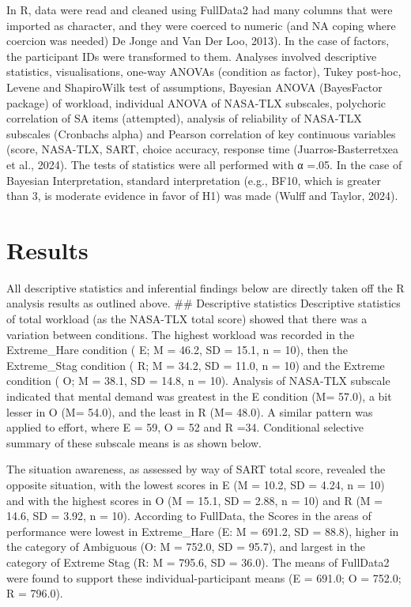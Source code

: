 \documentclass[
]{article}
\begin{document}
In R, data were read and cleaned using FullData2 had many columns that
were imported as character, and they were coerced to numeric (and NA
coping where coercion was needed) De Jonge and Van Der Loo, 2013). In
the case of factors, the participant IDs were transformed to them.
Analyses involved descriptive statistics, visualisations, one-way ANOVAs
(condition as factor), Tukey post-hoc, Levene and ShapiroWilk test of
assumptions, Bayesian ANOVA (BayesFactor package) of workload,
individual ANOVA of NASA-TLX subscales, polychoric correlation of SA
items (attempted), analysis of reliability of NASA-TLX subscales
(Cronbachs alpha) and Pearson correlation of key continuous variables
(score, NASA-TLX, SART, choice accuracy, response time
(Juarros-Basterretxea et al., 2024). The tests of statistics were all
performed with α =.05. In the case of Bayesian Interpretation, standard
interpretation (e.g., BF10, which is greater than 3, is moderate
evidence in favor of H1) was made (Wulff and Taylor, 2024).

\section{Results}\label{results}

All descriptive statistics and inferential findings below are directly
taken off the R analysis results as outlined above. \#\# Descriptive
statistics Descriptive statistics of total workload (as the NASA-TLX
total score) showed that there was a variation between conditions. The
highest workload was recorded in the Extreme\_Hare condition ( E; M =
46.2, SD = 15.1, n = 10), then the Extreme\_Stag condition ( R; M =
34.2, SD = 11.0, n = 10) and the Extreme condition ( O; M = 38.1, SD =
14.8, n = 10). Analysis of NASA-TLX subscale indicated that mental
demand was greatest in the E condition (M= 57.0), a bit lesser in O (M=
54.0), and the least in R (M= 48.0). A similar pattern was applied to
effort, where E = 59, O = 52 and R =34. Conditional selective summary of
these subscale means is as shown below.

The situation awareness, as assessed by way of SART total score,
revealed the opposite situation, with the lowest scores in E (M = 10.2,
SD = 4.24, n = 10) and with the highest scores in O (M = 15.1, SD =
2.88, n = 10) and R (M = 14.6, SD = 3.92, n = 10). According to
FullData, the Scores in the areas of performance were lowest in
Extreme\_Hare (E: M = 691.2, SD = 88.8), higher in the category of
Ambiguous (O: M = 752.0, SD = 95.7), and largest in the category of
Extreme Stag (R: M = 795.6, SD = 36.0). The means of FullData2 were
found to support these individual-participant means (E = 691.0; O =
752.0; R = 796.0).
\end{document}
